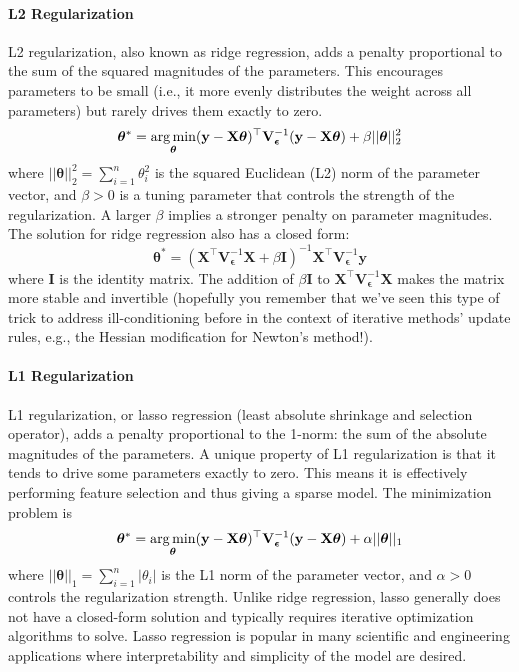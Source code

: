 \paragraph*{L2 Regularization}
L2 regularization, also known as ridge regression, adds a penalty proportional to the sum of the squared magnitudes of the parameters. This encourages parameters to be small (i.e., it more evenly distributes the weight across all parameters) but rarely drives them exactly to zero.
\begin{equation}
    \boldsymbol{\theta}^* = \operatorname*{arg\,min}_{\boldsymbol{\theta}} (\mathbf{y} - \mathbf{X}\boldsymbol{\theta})^\top \mathbf{V}_{\boldsymbol{\epsilon}}^{-1} (\mathbf{y} - \mathbf{X}\boldsymbol{\theta}) + \beta||\boldsymbol{\theta}||_2^2 
    \label{eq:l2-regularization}
\end{equation}
where $||\boldsymbol{\theta}||_2^2 = \sum_{i=1}^n \theta_i^2$ is the squared Euclidean (L2) norm of the parameter vector, and $\beta > 0$ is a tuning parameter that controls the strength of the regularization. A larger $\beta$ implies a stronger penalty on parameter magnitudes. The solution for ridge regression also has a closed form: 
\begin{equation}
    \boldsymbol{\theta}^* = (\mathbf{X}^\top\mathbf{V}_{\boldsymbol{\epsilon}}^{-1}\mathbf{X} + \beta\mathbf{I})^{-1}\mathbf{X}^\top\mathbf{V}_{\boldsymbol{\epsilon}}^{-1}\mathbf{y}
\end{equation}
where $\mathbf{I}$ is the identity matrix. The addition of $\beta\mathbf{I}$ to $\mathbf{X}^\top\mathbf{V}_{\boldsymbol{\epsilon}}^{-1}\mathbf{X}$ makes the matrix more stable and invertible (hopefully you remember that we've seen this type of trick to address ill-conditioning before in the context of iterative methods' update rules, e.g., the Hessian modification for Newton's method!).

\paragraph*{L1 Regularization}
L1 regularization, or lasso regression (least absolute shrinkage and selection operator), adds a penalty proportional to the 1-norm: the sum of the absolute magnitudes of the parameters. A unique property of L1 regularization is that it tends to drive some parameters exactly to zero. This means it is effectively performing feature selection and thus giving a sparse model. The minimization problem is
\begin{equation}
    \boldsymbol{\theta}^* = \operatorname*{arg\,min}_{\boldsymbol{\theta}} (\mathbf{y} - \mathbf{X}\boldsymbol{\theta})^\top \mathbf{V}_{\boldsymbol{\epsilon}}^{-1} (\mathbf{y} - \mathbf{X}\boldsymbol{\theta}) + \alpha||\boldsymbol{\theta}||_1
    \label{eq:l1-regularization}
\end{equation}
where $||\boldsymbol{\theta}||_1 = \sum_{i=1}^n |\theta_i|$ is the L1 norm of the parameter vector, and $\alpha > 0$ controls the regularization strength. Unlike ridge regression, lasso generally does not have a closed-form solution and typically requires iterative optimization algorithms to solve. Lasso regression is popular in many scientific and engineering applications where interpretability and simplicity of the model are desired.

